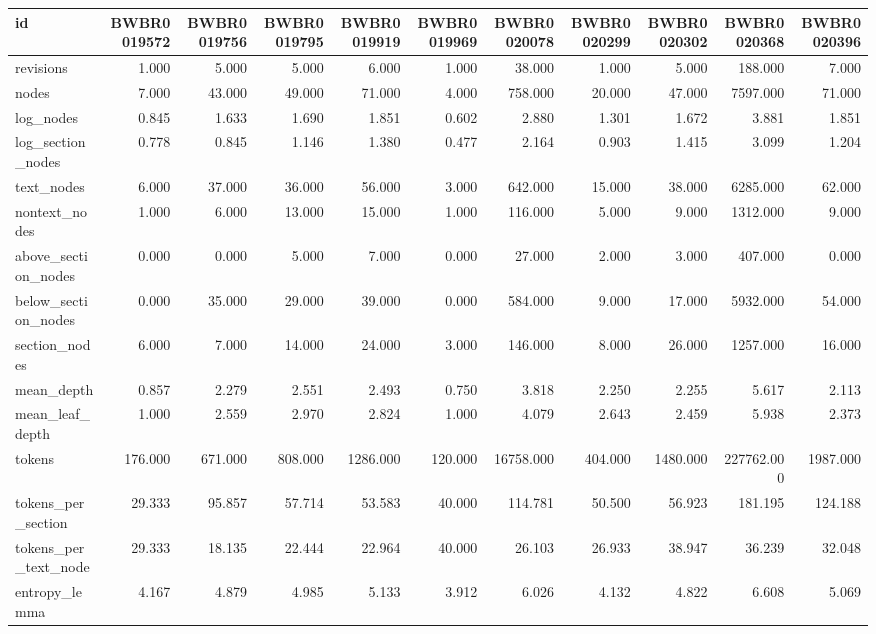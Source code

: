 \begin{tabular}{lrrrrrrrrrr}
\toprule
id & BWBR0019572 & BWBR0019756 & BWBR0019795 & BWBR0019919 & BWBR0019969 & BWBR0020078 & BWBR0020299 & BWBR0020302 & BWBR0020368 & BWBR0020396 \\
\midrule
revisions & 1.000 & 5.000 & 5.000 & 6.000 & 1.000 & 38.000 & 1.000 & 5.000 & 188.000 & 7.000 \\
\cline{1-11}
nodes & 7.000 & 43.000 & 49.000 & 71.000 & 4.000 & 758.000 & 20.000 & 47.000 & 7597.000 & 71.000 \\
\cline{1-11}
log\_nodes & 0.845 & 1.633 & 1.690 & 1.851 & 0.602 & 2.880 & 1.301 & 1.672 & 3.881 & 1.851 \\
\cline{1-11}
log\_section\_nodes & 0.778 & 0.845 & 1.146 & 1.380 & 0.477 & 2.164 & 0.903 & 1.415 & 3.099 & 1.204 \\
\cline{1-11}
text\_nodes & 6.000 & 37.000 & 36.000 & 56.000 & 3.000 & 642.000 & 15.000 & 38.000 & 6285.000 & 62.000 \\
\cline{1-11}
nontext\_nodes & 1.000 & 6.000 & 13.000 & 15.000 & 1.000 & 116.000 & 5.000 & 9.000 & 1312.000 & 9.000 \\
\cline{1-11}
above\_section\_nodes & 0.000 & 0.000 & 5.000 & 7.000 & 0.000 & 27.000 & 2.000 & 3.000 & 407.000 & 0.000 \\
\cline{1-11}
below\_section\_nodes & 0.000 & 35.000 & 29.000 & 39.000 & 0.000 & 584.000 & 9.000 & 17.000 & 5932.000 & 54.000 \\
\cline{1-11}
section\_nodes & 6.000 & 7.000 & 14.000 & 24.000 & 3.000 & 146.000 & 8.000 & 26.000 & 1257.000 & 16.000 \\
\cline{1-11}
mean\_depth & 0.857 & 2.279 & 2.551 & 2.493 & 0.750 & 3.818 & 2.250 & 2.255 & 5.617 & 2.113 \\
\cline{1-11}
mean\_leaf\_depth & 1.000 & 2.559 & 2.970 & 2.824 & 1.000 & 4.079 & 2.643 & 2.459 & 5.938 & 2.373 \\
\cline{1-11}
tokens & 176.000 & 671.000 & 808.000 & 1286.000 & 120.000 & 16758.000 & 404.000 & 1480.000 & 227762.000 & 1987.000 \\
\cline{1-11}
tokens\_per\_section & 29.333 & 95.857 & 57.714 & 53.583 & 40.000 & 114.781 & 50.500 & 56.923 & 181.195 & 124.188 \\
\cline{1-11}
tokens\_per\_text\_node & 29.333 & 18.135 & 22.444 & 22.964 & 40.000 & 26.103 & 26.933 & 38.947 & 36.239 & 32.048 \\
\cline{1-11}
entropy\_lemma & 4.167 & 4.879 & 4.985 & 5.133 & 3.912 & 6.026 & 4.132 & 4.822 & 6.608 & 5.069 \\

\end{tabular}
